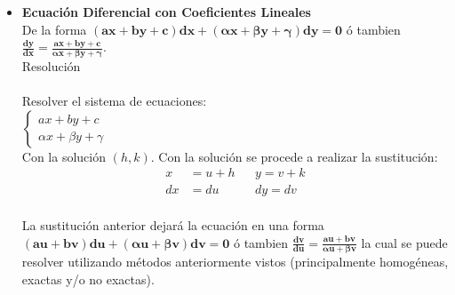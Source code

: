 \documentclass{article}
\begin{document}
\begin{itemize}
    \item \textbf{Ecuación Diferencial con Coeficientes Lineales} \\
    De la forma $\boldsymbol{ (ax + by + c)dx + (\alpha x + \beta y + \gamma )dy = 0 }$ ó tambien 
    $\boldsymbol{ \frac{dy}{dx} = \frac{ax + by + c}{\alpha x + \beta y + \gamma } }$. \\
    Resolución \\
    \\ Resolver el sistema de ecuaciones: \\
    $ \begin{cases}
        ax + by + c \\ 
        \alpha x + \beta y + \gamma  
       \end{cases} 
    $ \\
    Con la solución $ (h,k) $. Con la solución se procede a realizar la sustitución: \\
    \begin{align*}
        x & = u + h && y  = v + k \\
        dx & = du && dy  = dv
    \end{align*}\\
    La sustitución anterior dejará la ecuación en una forma $\boldsymbol{ (au + bv)du + (\alpha u + \beta v)dv = 0 }$ ó tambien 
    $\boldsymbol{ \frac{dv}{du} = \frac{au + bv }{\alpha u + \beta v} }$ la cual se puede resolver utilizando métodos anteriormente vistos
    (principalmente homogéneas, exactas y/o no exactas).
\end{itemize}
\end{document}
